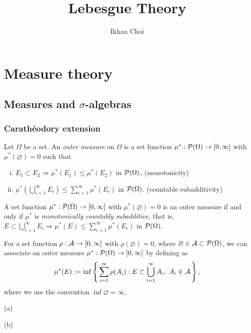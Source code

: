 \documentclass{../note}
\begin{document}
\title{Lebesgue Theory}
\author{Ikhan Choi}
\maketitle
\tableofcontents

\part{Measure theory}





\chapter{Measures and $\sigma$-algebras}


\section{Carath\'eodory extension}
\begin{prb}
Let $\Omega$ be a set.
An \emph{outer measure} on $\Omega$ is a set function $\mu^*:\mathcal{P}(\Omega)\to[0,\infty]$ with $\mu^*(\varnothing)=0$ such that
\begin{enumerate}[(i)]
\item $E_1\subset E_2\Rightarrow\mu^*(E_1)\le\mu^*(E_2)$ in $\mathcal{P}(\Omega)$,
\hfill(monotonicity)
\item $\mu^*(\bigcup_{i=1}^\infty E_i)\le\sum_{i=1}^\infty\mu^*(E_i)$ in $\mathcal{P}(\Omega)$.
\hfill(countable subadditivity)
\end{enumerate}
\begin{parts}
\item A set function $\mu^*:\mathcal{P}(\Omega)\to[0,\infty]$ with $\mu^*(\varnothing)=0$ is an outer measure if and only if $\mu^*$ is \emph{monotonically countably subadditive}, that is, $E\subset\bigcup_{i=1}^\infty E_i\Rightarrow\mu^*(E)\le\sum_{i=1}^\infty\mu^*(E_i)$ in $\mathcal{P}(\Omega)$.
\item
For a set function $\rho:\mathcal{A}\to[0,\infty]$ with $\rho(\varnothing)=0$, where $\varnothing\in\mathcal{A}\subset\mathcal{P}(\Omega)$, we can associate an outer measure $\mu^*:\mathcal{P}(\Omega)\to[0,\infty]$ by defining as
\[\mu^*(E):=\inf\left\{\,\sum_{i=1}^\infty\rho(A_i):E\subset\bigcup_{i=1}^\infty A_i,\ A_i\in\mathcal{A}\,\right\},\]
where we use the convention $\inf\varnothing=\infty$.
\end{parts}
\end{prb}
\begin{pf}
(a)


(b)


\end{pf}
\end{document}
